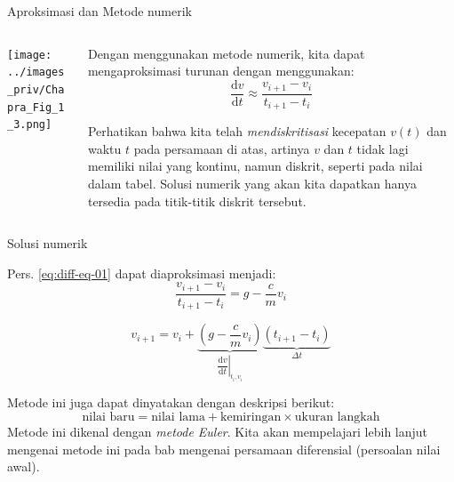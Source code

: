 \begin{frame}{Aproksimasi dan Metode numerik}

\begin{columns}[T]
\begin{column}{0.5\textwidth}
{\centering
\texttt{[image: ../images\_priv/Chapra\_Fig\_1\_3.png]}
\par}
\end{column}

\begin{column}{0.5\textwidth}
Dengan menggunakan metode numerik, kita dapat mengaproksimasi turunan
dengan menggunakan:
\begin{equation*}
\frac{\mathrm{d}v}{\mathrm{d}t} \approx \frac{v_{i+1} - v_{i}}{t_{i+1} - t_{i}}
\end{equation*}

Perhatikan bahwa kita telah \emph{mendiskritisasi} kecepatan \(v(t)\)
dan waktu \(t\) pada persamaan di atas, artinya \(v\) dan \(t\) tidak
lagi memiliki nilai yang kontinu, namun diskrit, seperti pada nilai
dalam tabel. Solusi numerik yang akan kita dapatkan hanya tersedia pada
titik-titik diskrit tersebut.
\end{column}
\end{columns}
\end{frame}




\begin{frame}{Solusi numerik}

\fontsize{9pt}{10pt}\selectfont

Pers. \eqref{eq:diff-eq-01} dapat
diaproksimasi menjadi:
\begin{equation*}
\frac{v_{i+1} - v_{i}}{t_{i+1} - t_{i}} = g - \frac{c}{m} v_{i}
\end{equation*}

\begin{equation*}
v_{i+1} = v_{i} + \underbrace{\left( g - \frac{c}{m} v_{i} \right)}_{
  \left.\dfrac{\mathrm{d}v}{\mathrm{d}t}\right|_{t_{i},v_{i}}
}
\underbrace{\left( t_{i+1} - t_{i} \right)}_{\Delta t}
\end{equation*}

Metode ini juga dapat dinyatakan dengan deskripsi berikut:
\begin{equation*}
\text{nilai baru} = \text{nilai lama} + \text{kemiringan}\times\text{ukuran langkah}
\end{equation*}
Metode ini dikenal dengan \emph{metode Euler}. Kita akan mempelajari
lebih lanjut mengenai metode ini pada bab mengenai persamaan diferensial
(persoalan nilai awal).
\end{frame}



